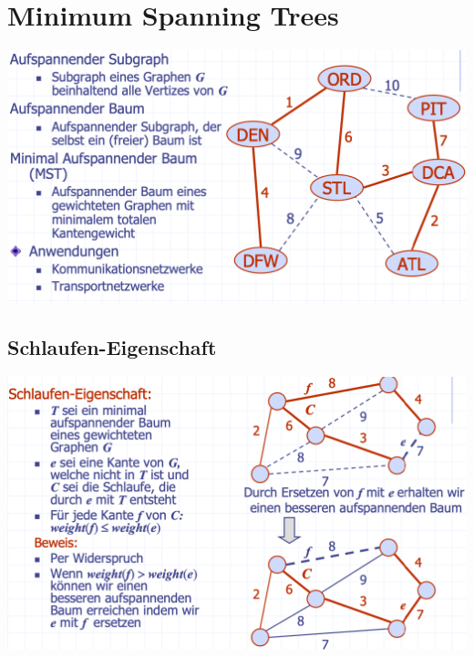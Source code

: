 \section{Minimum Spanning Trees}
\begin{center}
    \includegraphics[scale=.32]{graphic/16 MinimumSpanningTrees/Minimum Spanning Tree.png}
\end{center}
\vspace{-8pt}

\subsection{Schlaufen-Eigenschaft}
\begin{center}
    \includegraphics[scale=.32]{graphic/16 MinimumSpanningTrees/Schlaufen-Eigenschaft.png}
\end{center}
\vspace{-8pt}

